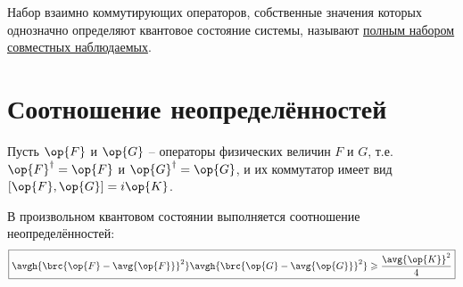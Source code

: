\begin{defn}
Набор взаимно коммутирующих операторов, собственные значения которых однозначно определяют квантовое состояние системы, называют \underline{полным набором совместных наблюдаемых}.
\end{defn}

\section{Соотношение неопределённостей}

Пусть $\op{F}$ и $\op{G}$ -- операторы физических величин $F$ и $G$, т.е. $\op{F}^\dag=\op{F}$ и $\op{G}^\dag=\op{G}$, и их коммутатор имеет вид $[\op{F},\op{G}]=i\op{K}$.

\begin{thm}
В произвольном квантовом состоянии выполняется соотношение неопределённостей:
$$
  \boxed{
    \avgh{\brc{\op{F}-\avg{\op{F}}}^2} \avgh{\brc{\op{G}-\avg{\op{G}}}^2} \geqslant
      \frac{\avg{\op{K}}^2}{4}}
$$
\end{thm}

